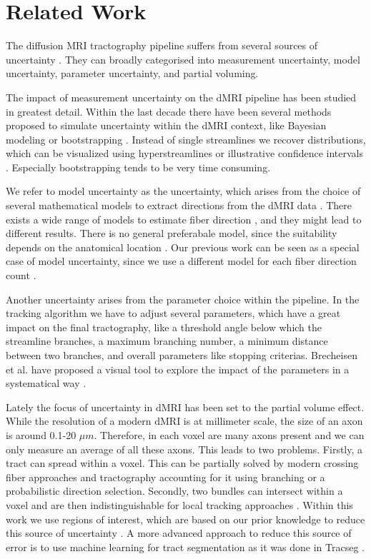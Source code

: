 \section{Related Work}\label{related}
The diffusion MRI tractography pipeline suffers from several sources of
uncertainty \cite{Schultz:SciVisBook2014, Schultz:NBM2018, Gillmann:STAR2021}.
They can broadly categorised into measurement uncertainty,
model uncertainty, parameter uncertainty, and partial voluming. 

The impact of measurement
uncertainty on the dMRI pipeline has been studied in greatest detail. Within the last
decade there have been several methods proposed to simulate uncertainty within
the dMRI context, like Bayesian modeling \cite{BEHRENS2007144} or bootstrapping
\cite{Chung:2006}. Instead of single streamlines we recover distributions,
which can be visualized using hyperstreamlines \cite{Jeurissen:2012, Wiens:2014}
or illustrative confidence intervals \cite{Brecheisen:2013}. Especially
bootstrapping tends to be very time consuming.

We refer to model uncertainty as the uncertainty, which arises from the choice
of several mathematical models to extract directions from the dMRI data
\cite{Schultz:SciVisBook2014}. There exists a wide range of models to estimate
fiber direction \cite{Panagiotaki:2012}, and they might lead to different
results. There is no general preferabale model, since the suitability depends  on
the anatomical location \cite{Bretthorst:2004,Freidlin:2007}. Our previous work
can be seen as a special case of model uncertainty, since we use a different model
for each fiber direction count \cite{Gruen:2021}. 

Another uncertainty arises from the parameter choice within the pipeline. In the
tracking algorithm we have to adjust several parameters, which have a great
impact on the final tractography, like a threshold angle below which the streamline
branches, a maximum branching number, a minimum distance between two branches,
and overall parameters like stopping criterias. Brecheisen et al. have proposed
a visual
tool to explore the impact of the parameters in a systematical way
\cite{Brecheisen:2009}.

Lately the focus of uncertainty in dMRI has been set to the partial volume
effect. While the resolution of a modern dMRI is at millimeter scale, the size of an axon is around 0.1-20 $\mu m$. Therefore, in each voxel
are many axons present and we can only measure an average of all these axons.
This leads to two problems. Firstly, a tract can spread within a voxel. This can
be partially solved by modern crossing fiber approaches and
tractography accounting for it using branching or a probabilistic direction
selection.
Secondly, two bundles can intersect
within a voxel and are then indistinguishable for local tracking approaches
\cite{Schilling:2022}. Within this work we use regions of interest, which are
based on our prior knowledge to reduce this source of uncertainty
\cite{MaierHein:2017}. A more
advanced approach to reduce this source of error is to use machine learning for
tract segmentation as it was done in Tracseg \cite{WASSERTHAL2018239}.


